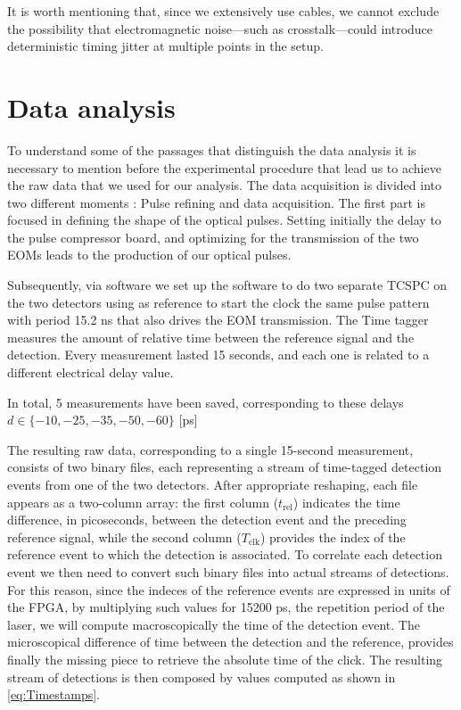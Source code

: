 It is worth mentioning that, since we extensively use cables, we cannot exclude the possibility that electromagnetic noise—such as crosstalk—could introduce deterministic timing jitter at multiple points in the setup.

\section{Data analysis}
\label{sec:DataAnalysis}
To understand some of the passages that distinguish the data analysis it is necessary to mention before the experimental procedure that lead us to achieve the raw data that we used for our analysis.
The data acquisition is divided into two different moments : Pulse refining and data acquisition.
The first part is focused in defining the shape of the optical pulses. Setting initially the delay to the pulse compressor board, and optimizing for the transmission of the two EOMs leads to the production of our optical pulses.

Subsequently, via software we set up the software to do two separate TCSPC on the two detectors using as reference to start the clock the same pulse pattern with period 15.2 ns that also drives the EOM transmission.
The Time tagger measures the amount of relative time between the reference signal and the detection.
Every measurement lasted 15 seconds, and each one is related to a different electrical delay value.

In total, 5 measurements have been saved, corresponding to these delays $d \in \{-10,-25, -35, -50, -60\}$ [ps]

The resulting raw data, corresponding to a single 15-second measurement, consists of two binary files, each representing a stream of time-tagged detection events from one of the two detectors.
After appropriate reshaping, each file appears as a two-column array: the first column ($t_{\text{rel}}$) indicates the time difference, in picoseconds, between the detection event and the preceding reference signal, while the second column ($T_{\text{clk}}$) provides the index of the reference event to which the detection is associated.
To correlate each detection event we then need to convert such binary files into actual streams of detections.
For this reason, since the indeces of the reference events are expressed in units of the FPGA, by multiplying such values for 15200 ps, the repetition period of the laser, we will compute macroscopically the time of the detection event.
The microscopical difference of time between the detection and the reference, provides finally the missing piece to retrieve the absolute time of the click.
The resulting stream of detections is then composed by values computed as shown in \autoref{eq:Timestamps}.

